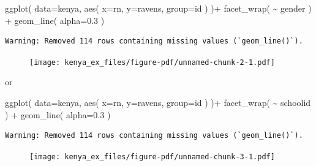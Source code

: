 \documentclass[
  letterpaper,
  DIV=11,
  numbers=noendperiod]{scrreprt}
\newenvironment{Shaded}{\begin{snugshade}}{\end{snugshade}}
\newcommand{\AttributeTok}[1]{\textcolor[rgb]{0.49,0.56,0.16}{#1}}
\newcommand{\FloatTok}[1]{\textcolor[rgb]{0.25,0.63,0.44}{#1}}
\newcommand{\FunctionTok}[1]{\textcolor[rgb]{0.02,0.16,0.49}{#1}}
\newcommand{\NormalTok}[1]{\textcolor[rgb]{0.00,0.44,0.13}{#1}}
\newcommand{\SpecialCharTok}[1]{\textcolor[rgb]{0.25,0.44,0.63}{#1}}
\begin{document}
\begin{Shaded}
\begin{Highlighting}[]
\FunctionTok{ggplot}\NormalTok{( }\AttributeTok{data=}\NormalTok{kenya, }\FunctionTok{aes}\NormalTok{( }\AttributeTok{x=}\NormalTok{rn, }\AttributeTok{y=}\NormalTok{ravens, }\AttributeTok{group=}\NormalTok{id )  )}\SpecialCharTok{+} 
            \FunctionTok{facet\_wrap}\NormalTok{( }\SpecialCharTok{\textasciitilde{}}\NormalTok{ gender ) }\SpecialCharTok{+} 
            \FunctionTok{geom\_line}\NormalTok{( }\AttributeTok{alpha=}\FloatTok{0.3}\NormalTok{ )}
\end{Highlighting}
\end{Shaded}

\begin{verbatim}
Warning: Removed 114 rows containing missing values (`geom_line()`).
\end{verbatim}

\begin{figure}[H]

{\centering \texttt{[image: kenya\_ex\_files/figure-pdf/unnamed-chunk-2-1.pdf]}

}

\end{figure}

or

\begin{Shaded}
\begin{Highlighting}[]
\FunctionTok{ggplot}\NormalTok{( }\AttributeTok{data=}\NormalTok{kenya, }\FunctionTok{aes}\NormalTok{( }\AttributeTok{x=}\NormalTok{rn, }\AttributeTok{y=}\NormalTok{ravens, }\AttributeTok{group=}\NormalTok{id )  )}\SpecialCharTok{+} 
            \FunctionTok{facet\_wrap}\NormalTok{( }\SpecialCharTok{\textasciitilde{}}\NormalTok{ schoolid ) }\SpecialCharTok{+} 
            \FunctionTok{geom\_line}\NormalTok{( }\AttributeTok{alpha=}\FloatTok{0.3}\NormalTok{ )}
\end{Highlighting}
\end{Shaded}

\begin{verbatim}
Warning: Removed 114 rows containing missing values (`geom_line()`).
\end{verbatim}

\begin{figure}[H]

{\centering \texttt{[image: kenya\_ex\_files/figure-pdf/unnamed-chunk-3-1.pdf]}

}

\end{figure}
\end{document}

